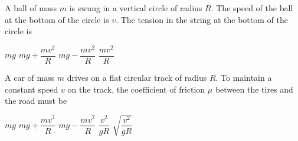 \documentclass{../../oss-apphys-exam}
\begin{document}
\begin{multicols*}{2}
\begin{questions}
%
%      
%    
    
    \question A ball of mass $m$ is swung in a vertical circle of radius $R$.
    The speed of the ball at the bottom of the circle is $v$. The tension
    in the string at the bottom of the circle is
    \begin{choices}
      \choice $mg$
      \choice $mg+\dfrac{mv^2}R$
      \choice $mg-\dfrac{mv^2}R$
      \choice $\dfrac{mv^2}R$
    \end{choices}
    
    \question A car of mass $m$ drives on a flat circular track of radius $R$.
    To maintain a constant speed $v$ on the track, the coefficient of
    friction $\mu$ between the tires and the road must be
    \begin{choices}
      \choice $mg$
      \choice $mg+\dfrac{mv^2}R$
      \choice $mg-\dfrac{mv^2}R$
      \choice $\dfrac{v^2}{gR}$
      \choice $\sqrt{\dfrac{v^2}{gR}}$
    \end{choices}
    \columnbreak
    


\end{questions}
\end{multicols*}
\end{document}
